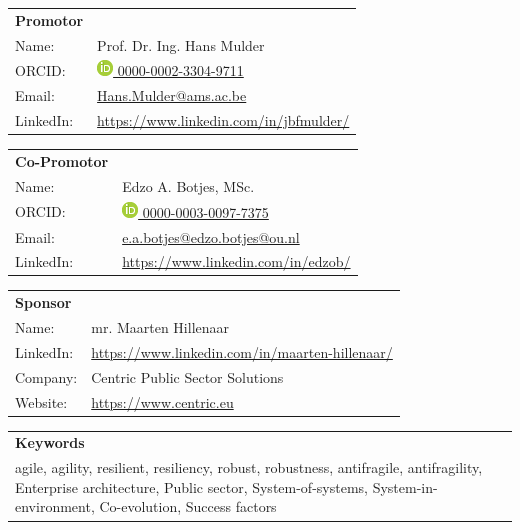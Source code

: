 \vspace{\baselineskip}

	\begin{tabular}{p{}p{}}
		\textbf{Promotor} & \\
		Name: & Prof. Dr. Ing. Hans Mulder \\
		ORCID: & \href{https://orcid.org/0000-0002-3304-9711/}{\includegraphics[scale=0.45]{images/ORCIDiD_icon} 0000-0002-3304-9711}\\
		Email: & \href{mailto:hans.mulder@ams.ac.be}{Hans.Mulder@ams.ac.be}\\
		LinkedIn: & \url{https://www.linkedin.com/in/jbfmulder/}\\
	\end{tabular}

\vspace{\baselineskip}

	\begin{tabular}{p{}p{}}
		\textbf{Co-Promotor} & \\
		Name: & Edzo A. Botjes, MSc. \\
		ORCID: & \href{https://orcid.org/0000-0003-0097-7375/}{\includegraphics[scale=0.45]{images/ORCIDiD_icon} 0000-0003-0097-7375}\\
		Email: & \href{mailto:edzo.botjes@ou.nl}{e.a.botjes@edzo.botjes@ou.nl}\\
		LinkedIn: & \url{https://www.linkedin.com/in/edzob/}\\
	\end{tabular}

\vspace{\baselineskip}

	\begin{tabular}{p{}p{}}
		\textbf{Sponsor} & \\
		Name: & mr. Maarten Hillenaar \\
		LinkedIn:	&	\url{https://www.linkedin.com/in/maarten-hillenaar/}\\
		Company:	&	Centric Public Sector Solutions\\
		Website:	&	\url{https://www.centric.eu}
	\end{tabular}

\vspace{\baselineskip}

	\begin{tabular}{p{}}
		\textbf{Keywords} \\
		\Gls{agile}, \Gls{agility}, \Gls{resilient}, \Gls{resiliency}, \Gls{robust}, \Gls{robustness}, \Gls{antifragile}, \Gls{antifragility}, Enterprise architecture, Public sector, System-of-systems, System-in-environment, Co-evolution, Success factors\\%
	\end{tabular}
